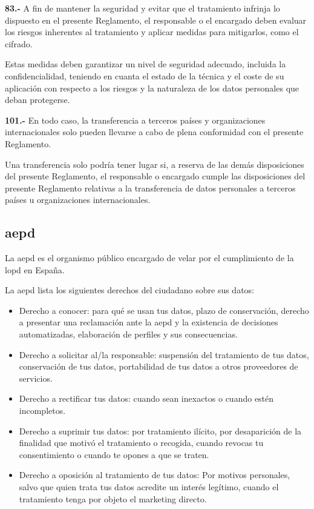 \textbf{83.-} A fin de mantener la seguridad y evitar que el tratamiento infrinja lo dispuesto en el presente Reglamento, el responsable o el encargado deben evaluar los riesgos inherentes al tratamiento y aplicar medidas para mitigarlos, como el cifrado.

Estas medidas deben garantizar un nivel de seguridad adecuado, incluida la confidencialidad, teniendo en cuanta el estado de la técnica y el coste de su aplicación con respecto a los riesgos y la naturaleza de los datos personales que deban protegerse.

\textbf{101.-} En todo caso, la transferencia a terceros países y organizaciones internacionales solo pueden llevarse a cabo de plena conformidad con el presente Reglamento.

Una transferencia solo podría tener lugar si, a reserva de las demás disposiciones del presente Reglamento, el responsable o encargado cumple las disposiciones del presente Reglamento relativas a la transferencia de datos personales a terceros países u organizaciones internacionales.

\subsection{\gls{aepd}}
La \gls{aepd} es el organismo público encargado de velar por el cumplimiento de la \gls{lopd} en España.

La \gls{aepd} lista los siguientes derechos del ciudadano sobre sus datos:
\begin{itemize}
    \item Derecho a conocer: para qué se usan tus datos, plazo de conservación, derecho a presentar una reclamación ante la \gls{aepd} y la existencia de decisiones automatizadas, elaboración de perfiles y sus consecuencias.
    \item Derecho a solicitar al/la responsable: suspensión del tratamiento de tus datos, conservación de tus datos, portabilidad de tus datos a otros proveedores de servicios.
    \item Derecho a rectificar tus datos: cuando sean inexactos o cuando estén incompletos.
    \item Derecho a suprimir tus datos: por tratamiento ilícito, por desaparición de la finalidad que motivó el tratamiento o recogida, cuando revocas tu consentimiento o cuando te opones a que se traten.
    \item Derecho a oposición al tratamiento de tus datos: Por motivos personales, salvo que quien trata tus datos acredite un interés legítimo, cuando el tratamiento tenga por objeto el marketing directo.
\end{itemize}


